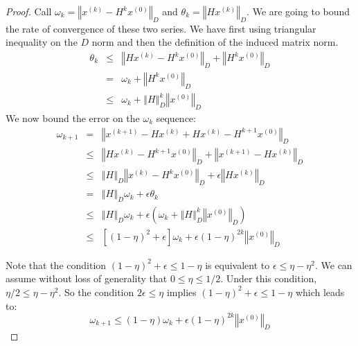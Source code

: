\begin{proof} Call $\omega_{k}=\left\Vert x^{\left(k\right)}-H^{k}x^{\left(0\right)}\right\Vert _{D}$
and $\theta_{k}=\left\Vert Hx^{\left(k\right)}\right\Vert _{D}$.
We are going to bound the rate of convergence of these two series.
We have first using triangular inequality on the $D$ norm and then
the definition of the induced matrix norm. 
\begin{eqnarray*}
\theta_{k} & \leq & \left\Vert Hx^{\left(k\right)}-H^{k}x^{\left(0\right)}\right\Vert _{D}+\left\Vert H^{k}x^{\left(0\right)}\right\Vert _{D}\\
 & = & \omega_{k}+\left\Vert H^{k}x^{\left(0\right)}\right\Vert _{D}\\
 & \leq & \omega_{k}+\left\Vert H\right\Vert _{D}^{k}\left\Vert x^{\left(0\right)}\right\Vert _{D}
\end{eqnarray*}
We now bound the error on the $\omega_{k}$ sequence: 
\begin{eqnarray*}
\omega_{k+1} & = & \left\Vert x^{\left(k+1\right)}-Hx^{\left(k\right)}+Hx^{\left(k\right)}-H^{k+1}x^{\left(0\right)}\right\Vert _{D}\\
 & \leq & \left\Vert Hx^{\left(k\right)}-H^{k+1}x^{\left(0\right)}\right\Vert _{D}+\left\Vert x^{\left(k+1\right)}-Hx^{\left(k\right)}\right\Vert _{D}\\
 & \leq & \left\Vert H\right\Vert _{D}\left\Vert x^{\left(k\right)}-H^{k}x^{\left(0\right)}\right\Vert _{D}+\epsilon\left\Vert Hx^{\left(k\right)}\right\Vert _{D}\\
 & = & \left\Vert H\right\Vert _{D}\omega_{k}+\epsilon\theta_{k}\\
 & \leq & \left\Vert H\right\Vert _{D}\omega_{k}+\epsilon\left(\omega_{k}+\left\Vert H\right\Vert _{D}^{k}\left\Vert x^{\left(0\right)}\right\Vert _{D}\right)\\
 & \leq & \left[\left(1-\eta\right)^{2}+\epsilon\right]\omega_{k}+\epsilon\left(1-\eta\right)^{2k}\left\Vert x^{\left(0\right)}\right\Vert _{D}
\end{eqnarray*}


Note that the condition $\left(1-\eta\right)^{2}+\epsilon\leq1-\eta$
is equivalent to $\epsilon\leq\eta-\eta^{2}$. We can assume without
loss of generality that $0\leq\eta\leq1/2$. Under this condition,
$\eta/2\leq\eta-\eta^{2}$. So the condition $2\epsilon\leq\eta$
implies $\left(1-\eta\right)^{2}+\epsilon\leq1-\eta$ which leads
to: 
\[
\omega_{k+1}\leq\left(1-\eta\right)\omega_{k}+\epsilon\left(1-\eta\right)^{2k}\left\Vert x^{\left(0\right)}\right\Vert _{D}
\]



\end{proof}
